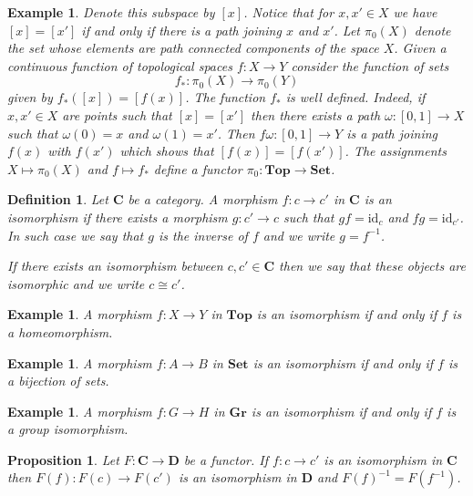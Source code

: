\documentclass[11pt, letterpaper, oneside]{report}
\theoremstyle{pplain}
\newtheorem{proposition}[theorem]{Proposition}
\theoremstyle{ddefinition}
\newtheorem{definition}[theorem]{Definition}
\newtheorem{example}[theorem]{Example}
\theoremstyle{nnn}
\theoremstyle{eexercise}
\newcommand{\id}{\mathrm{id}}
\newcommand{\CC}{{\mathbf C}}
\newcommand{\DD}{{\mathbf D}}
\newcommand{\Gr}{{\mathbf{Gr}}}
\newcommand{\Top}{{\mathbf{Top}}}
\newcommand{\Set}{{\mathbf{Set}}}
\begin{document}
\begin{example}
Denote this subspace by $[x]$.  Notice that for $x, x'\in X$ 
we have $[x] = [x']$ if and only if there is a path joining $x$ and $x'$. Let $\pi_{0}(X)$ denote the set 
whose elements are path connected components of the space $X$. Given a continuous function 
of topological spaces $f\colon X \to Y$ consider the function of sets 
$$f_{\ast}\colon \pi_{0}(X) \to \pi_{0}(Y)$$ 
given by $f_{\ast}([x]) = [f(x)]$. The function $f_{\ast}$ 
is well defined. Indeed, if  $x, x' \in X$ are points such that $[x] = [x']$ then there exists a path  
$\omega\colon [0, 1]\to X$ such that $\omega(0) =x$ and $\omega(1) = x'$. Then 
$f\omega\colon [0, 1]\to Y$ is a path joining $f(x)$ with $f(x')$ which shows that $[f(x)] = [f(x')]$. 
The assignments $X \mapsto \pi_{0}(X)$ and $f \mapsto f_{\ast}$ define a functor 
$\pi_{0}\colon \Top \to \Set$.
\end{example}

\begin{definition}
Let $\CC$ be a category. A morphism $f\colon c \to c'$ in $\CC$ is an \emph{isomorphism} if 
there exists a morphism $g\colon c'\to c$ such that $gf= \id_{c}$ and $fg = \id_{c'}$. In such case 
we say that $g$ is the \emph{inverse} of $f$ and we write $g = f^{-1}$. 

If there exists an isomorphism between  $c, c' \in \CC$ then we say that these objects are 
\emph{isomorphic} and we write $c\cong c'$.   
\end{definition}

\begin{example}
A morphism  $f\colon X \to Y$ in $\Top$ is an isomorphism if and only if $f$ is a homeomorphism. 
\end{example}

\begin{example}
A morphism  $f\colon A \to B$ in $\Set$ is an isomorphism if and only if $f$ is a bijection of sets. 
\end{example}

\begin{example}
A morphism  $f\colon G \to H$ in $\Gr$ is an isomorphism if and only if $f$ is a group isomorphism. 
\end{example}

\begin{proposition}
\label{FUNCTOR PRES ISO PROP}
Let $F\colon \CC \to \DD$ be a functor. If $f\colon c \to c'$ is an isomorphism in $\CC$ then 
$F(f)\colon F(c) \to F(c')$
is an isomorphism in $\DD$ and $F(f)^{-1} = F(f^{-1})$.
\end{proposition}
\end{document}
